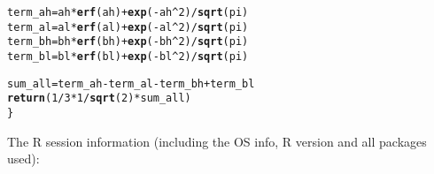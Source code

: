 \documentclass{article}\usepackage[]{graphicx}\usepackage[]{color}
\makeatletter
\newcommand{\hlnum}[1]{\textcolor[rgb]{0.686,0.059,0.569}{#1}}%
\newcommand{\hlopt}[1]{\textcolor[rgb]{0,0,0}{#1}}%
\newcommand{\hlstd}[1]{\textcolor[rgb]{0.345,0.345,0.345}{#1}}%
\newcommand{\hlkwb}[1]{\textcolor[rgb]{0.69,0.353,0.396}{#1}}%
\newcommand{\hlkwd}[1]{\textcolor[rgb]{0.737,0.353,0.396}{\textbf{#1}}}%
\newenvironment{kframe}{%
 \def\at@end@of@kframe{}%
 \ifinner\ifhmode%
  \def\at@end@of@kframe{\end{minipage}}%
  \begin{minipage}{\columnwidth}%
 \fi\fi%
 \def\FrameCommand##1{\hskip\@totalleftmargin \hskip-\fboxsep
 \colorbox{shadecolor}{##1}\hskip-\fboxsep
     \hskip-\linewidth \hskip-\@totalleftmargin \hskip\columnwidth}%
 \MakeFramed {\advance\hsize-\width
   \@totalleftmargin\z@ \linewidth\hsize
   \@setminipage}}%
 {\par\unskip\endMakeFramed%
 \at@end@of@kframe}
\newenvironment{knitrout}{}{} %
\makeatother
\begin{document}
\begin{knitrout}
\begin{kframe}
\begin{alltt}
  \hlstd{term_ah} \hlkwb{=} \hlstd{ah} \hlopt{*} \hlkwd{erf}\hlstd{(ah)} \hlopt{+} \hlkwd{exp}\hlstd{(}\hlopt{-}\hlstd{ah}\hlopt{^}\hlnum{2}\hlstd{)}\hlopt{/}\hlkwd{sqrt}\hlstd{(pi)}
  \hlstd{term_al} \hlkwb{=} \hlstd{al} \hlopt{*} \hlkwd{erf}\hlstd{(al)} \hlopt{+} \hlkwd{exp}\hlstd{(}\hlopt{-}\hlstd{al}\hlopt{^}\hlnum{2}\hlstd{)}\hlopt{/}\hlkwd{sqrt}\hlstd{(pi)}
  \hlstd{term_bh} \hlkwb{=} \hlstd{bh} \hlopt{*} \hlkwd{erf}\hlstd{(bh)} \hlopt{+} \hlkwd{exp}\hlstd{(}\hlopt{-}\hlstd{bh}\hlopt{^}\hlnum{2}\hlstd{)}\hlopt{/}\hlkwd{sqrt}\hlstd{(pi)}
  \hlstd{term_bl} \hlkwb{=} \hlstd{bl} \hlopt{*} \hlkwd{erf}\hlstd{(bl)} \hlopt{+} \hlkwd{exp}\hlstd{(}\hlopt{-}\hlstd{bl}\hlopt{^}\hlnum{2}\hlstd{)}\hlopt{/}\hlkwd{sqrt}\hlstd{(pi)}

  \hlstd{sum_all} \hlkwb{=} \hlstd{term_ah} \hlopt{-} \hlstd{term_al} \hlopt{-} \hlstd{term_bh} \hlopt{+} \hlstd{term_bl}
  \hlkwd{return}\hlstd{(}\hlnum{1}\hlopt{/}\hlnum{3} \hlopt{*} \hlnum{1}\hlopt{/}\hlkwd{sqrt}\hlstd{(}\hlnum{2}\hlstd{)} \hlopt{*} \hlstd{sum_all)}
\hlstd{\}}
\end{alltt}
\end{kframe}
\end{knitrout}

The R session information (including the OS info, R version and all
packages used):
\end{document}
